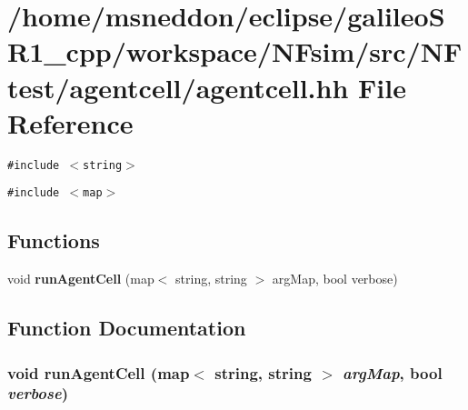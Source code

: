 \section{/home/msneddon/eclipse/galileoSR1\_\-cpp/workspace/NFsim/src/NFtest/agentcell/agentcell.hh File Reference}
\label{agentcell_8hh}


{\tt \#include $<$string$>$}\par
{\tt \#include $<$map$>$}\par
\subsection*{Functions}
\begin{CompactItemize}
\item 
void {\bf runAgentCell} (map$<$ string, string $>$ argMap, bool verbose)
\end{CompactItemize}


\subsection{Function Documentation}
\subsubsection{\setlength{\rightskip}{0pt plus 5cm}void runAgentCell (map$<$ string, string $>$ {\em argMap}, bool {\em verbose})}\label{agentcell_8hh_b3bca48acc52c98af56e755d0d017b31}


